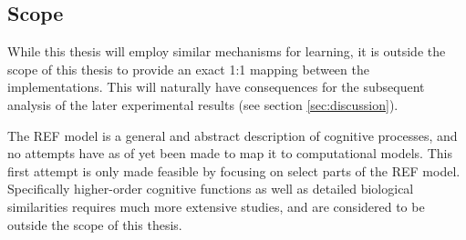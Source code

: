 \documentclass[report.tex]{subfiles}
\begin{document}
\subsection{Scope} \label{sec:scope}
While this thesis will employ similar mechanisms for learning, 
it is outside the scope of this thesis to provide an exact 1:1 mapping
between the implementations.
This will naturally have consequences for the subsequent analysis of the
later experimental results (see section \ref{sec:discussion}).

The \gls{REF} model is a general and abstract description of cognitive
processes, and no attempts have as of yet been made to map it to
computational models.
This first attempt is only made feasible by focusing on select parts
of the \gls{REF} model. 
Specifically higher-order cognitive functions as well as detailed 
biological similarities requires much more extensive studies, and are
considered to be outside the scope of this thesis.
\end{document}
